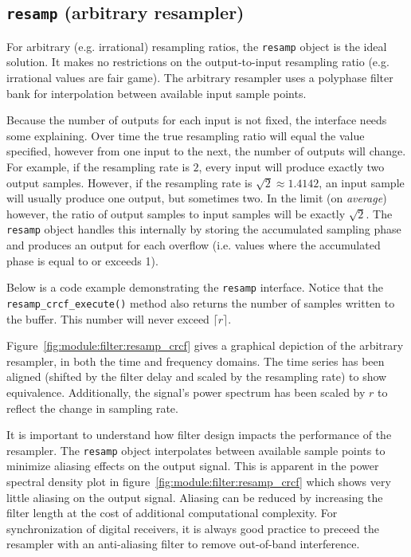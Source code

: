 \subsection{{\tt resamp} (arbitrary resampler)}
For arbitrary (e.g. irrational) resampling ratios, the {\tt resamp} object is
the ideal solution.
It makes no restrictions on the output-to-input resampling ratio (e.g.
irrational values are fair game).
The arbitrary resampler uses a polyphase filter bank for interpolation between
available input sample points.

Because the number of outputs for each input is not fixed, the interface needs
some explaining.
Over time the true resampling ratio will equal the value specified, however
from one input to the next, the number of outputs will change.
For example, if the resampling rate is $2$, every input will produce exactly
two output samples.
However, if the resampling rate is $\sqrt{2} \approx 1.4142$, an input sample
will usually produce one output, but sometimes two.
In the limit (on {\it average}) however, the ratio of output samples to input
samples will be exactly $\sqrt{2}$.
The {\tt resamp} object handles this internally by storing the accumulated
sampling phase and produces an output for each overflow (i.e. values where the
accumulated phase is equal to or exceeds 1).

Below is a code example demonstrating the {\tt resamp} interface.
Notice that the {\tt resamp\_crcf\_execute()} method also returns the number
of samples written to the buffer.
This number will never exceed $\lceil r \rceil$.



Figure~\ref{fig:module:filter:resamp_crcf} gives a graphical depiction of the
arbitrary resampler, in both the time and frequency domains.
The time series has been aligned (shifted by the filter delay and scaled by
the resampling rate) to show equivalence.
Additionally, the signal's power spectrum has been scaled by $r$ to reflect
the change in sampling rate.

It is important to understand how filter design impacts the performance of the
resampler.
The {\tt resamp} object interpolates between available sample points to
minimize aliasing effects on the output signal.
This is apparent in the power spectral density plot in
figure~\ref{fig:module:filter:resamp_crcf} which shows very little aliasing on
the output signal.
Aliasing can be reduced by increasing the filter length at the cost of
additional computational complexity.
For synchronization of digital receivers, it is always good practice to
preceed the resampler with an anti-aliasing filter to remove out-of-band
interference.

